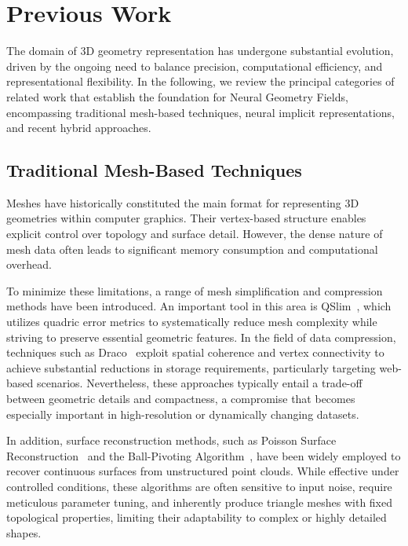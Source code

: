 \section{Previous Work}\label{sec:PreviousWork}

The domain of 3D geometry representation has undergone substantial evolution, driven by the ongoing need to balance precision, computational efficiency, and representational flexibility.  
In the following, we review the principal categories of related work that establish the foundation for Neural Geometry Fields, encompassing traditional mesh-based techniques, neural implicit representations, and recent hybrid approaches.  

\subsection{Traditional Mesh-Based Techniques}

Meshes have historically constituted the main format for representing 3D geometries within computer graphics.  
Their vertex-based structure enables explicit control over topology and surface detail.  
However, the dense nature of mesh data often leads to significant memory consumption and computational overhead.  

To minimize these limitations, a range of mesh simplification and compression methods have been introduced.  
An important tool in this area is QSlim~\cite{garland1997}, which utilizes quadric error metrics to systematically reduce mesh complexity while striving to preserve essential geometric features.  
In the field of data compression, techniques such as Draco~\cite{sajnani2020} exploit spatial coherence and vertex connectivity to achieve substantial reductions in storage requirements, particularly targeting web-based scenarios.  
Nevertheless, these approaches typically entail a trade-off between geometric details and compactness, a compromise that becomes especially important in high-resolution or dynamically changing datasets.  

In addition, surface reconstruction methods, such as Poisson Surface Reconstruction~\cite{kazhdan2006} and the Ball-Pivoting Algorithm~\cite{bernardini1999}, have been widely employed to recover continuous surfaces from unstructured point clouds.  
While effective under controlled conditions, these algorithms are often sensitive to input noise, require meticulous parameter tuning, and inherently produce triangle meshes with fixed topological properties, limiting their adaptability to complex or highly detailed shapes.  

